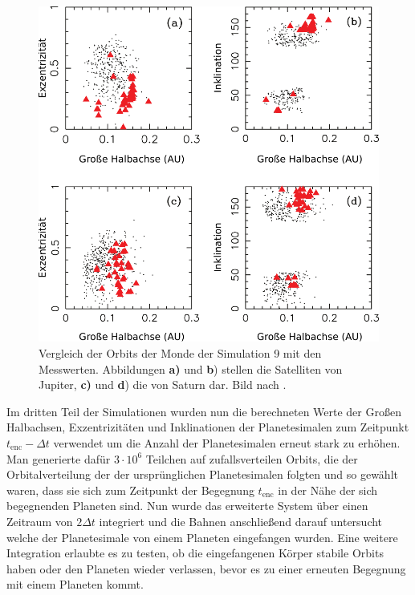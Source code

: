 \documentclass[12pt,a4paper,twoside]{article}
\renewcommand{\cite}{\citep}
\begin{document}
\begin{figure}[tbn]
\centering
\includegraphics[scale=0.7]{img/Nesvorny2007-7}
\caption{Vergleich der Orbits der Monde der Simulation 9 mit den Messwerten. Abbildungen \textbf{a)} und \textbf{b}) stellen die Satelliten von Jupiter, \textbf{c)} und \textbf{d}) die von Saturn dar. Bild nach \cite{Nesvorny2007}.} 
\label{fig:Sim9_Mondorbitale}
\end{figure}
Im dritten Teil der Simulationen wurden nun die berechneten Werte der Großen Halbachsen, Exzentrizitäten und Inklinationen der Planetesimalen zum Zeitpunkt $t_{\mathrm{enc}}-\Delta t$ verwendet um die Anzahl der Planetesimalen erneut stark zu erhöhen. Man generierte dafür $3 \cdot 10^6$ Teilchen auf zufallsverteilen Orbits, die der Orbitalverteilung der der ursprünglichen Planetesimalen folgten und so gewählt waren, dass sie sich zum Zeitpunkt der Begegnung $t_{\mathrm{enc}}$ in der Nähe der sich begegnenden Planeten sind.
Nun wurde das erweiterte System über einen Zeitraum von $2 \Delta t$ integriert und die Bahnen anschließend darauf untersucht welche der Planetesimale von einem Planeten eingefangen wurden.
Eine weitere Integration erlaubte es zu testen, ob die eingefangenen Körper stabile Orbits haben oder den Planeten wieder verlassen, bevor es zu einer erneuten Begegnung mit einem Planeten kommt.
\end{document}
